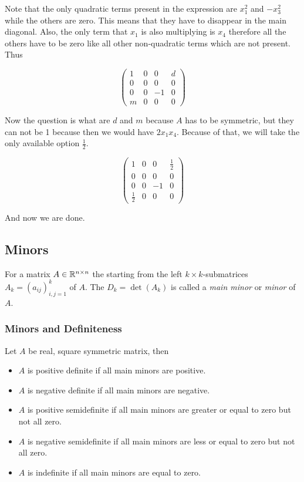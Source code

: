 Note that the only quadratic terms present in the expression are \(x_{1}^{2}\) and \(-x_{3}^{2}\) while the 
others are zero. This means that they have to disappear in the main diagonal. Also, the only term 
that \(x_1\) is also multiplying is \(x_4\) therefore all the others have to be zero like all 
other non-quadratic terms which are not present. Thus 

\[
    \begin{pmatrix}
        1 & 0 & 0 & d \\
        0 & 0 & 0 & 0 \\
        0 & 0 & -1 & 0 \\
        m & 0 & 0 & 0  
    \end{pmatrix}
\]

Now the question is what are \(d\) and \(m\) because \(A\) has to be symmetric, but they can not be 1 
because then we would have \(2x_1 x_4\). Because of that, we will take the only available option 
\(\frac{1}{2}\).

\[
    \begin{pmatrix}
        1 & 0 & 0 & \frac{1}{2} \\
        0 & 0 & 0 & 0 \\
        0 & 0 & -1 & 0 \\
        \frac{1}{2} & 0 & 0 & 0  
    \end{pmatrix}
\]

And now we are done.

\subsection{Minors}

For a matrix \(A \in \mathbb{R}^{n \times n}\) the starting from the left \(k \times k\)-submatrices 
\(A_k = (a_{ij})_{i,j=1}^{k}\) of \(A\). The \(D_k  = \det(A_k)\) is called a \emph{main minor} or 
\emph{minor} of \(A\).

\subsubsection{Minors and Definiteness}

Let \(A\) be real, square symmetric matrix, then

\begin{itemize}
    
    \item \(A\) is positive definite if all main minors are positive.

    \item \(A\) is negative definite if all main minors are negative.

    \item \(A\) is positive semidefinite if all main minors are greater or equal to zero but not all zero. 

    \item \(A\) is negative semidefinite if all main minors are less or equal to zero but not all zero.

    \item \(A\) is indefinite if all main minors are equal to zero.

\end{itemize}


